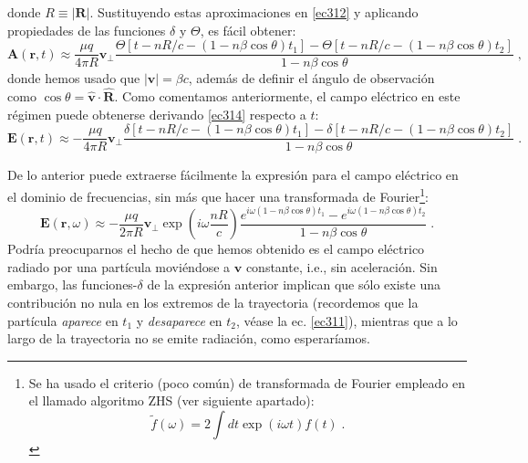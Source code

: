 \documentclass[11 pt, a4paper]{article} %
\numberwithin{equation}{section}
\numberwithin{figure}{section}
\numberwithin{table}{section}
\newcommand{\vect}[1]{\boldsymbol{\mathbf{#1}}}
\begin{document}
donde $R \equiv \left|\vect{R}\right|$. Sustituyendo estas aproximaciones en \eqref{ec312} y aplicando propiedades de las funciones $\delta$ y $\Theta$, es fácil obtener:
\begin{equation}
	\vect{A}\left(\vect{r}, t\right)\approx\frac{\mu q}{4\pi R}\vect{v}_\perp\frac{\Theta\left[t-nR/c-\left(1-n\beta\cos{\theta}\right)t_1\right]-\Theta\left[t-nR/c-\left(1-n\beta\cos{\theta}\right)t_2\right]}{1-n\beta\cos{\theta}}\;,\label{ec314}
\end{equation}
donde hemos usado que $\left|\vect{v}\right|=\beta c$, además de definir el ángulo de observación como $\cos{\theta}=\hat{\vect{v}}\cdot\hat{\vect{R}}$. Como comentamos anteriormente, el campo eléctrico en este régimen puede obtenerse derivando \eqref{ec314} respecto a $t$:
\begin{equation}
	\vect{E}\left(\vect{r}, t\right)\approx-\frac{\mu q}{4\pi R}\vect{v}_\perp\frac{\delta\left[t-nR/c-\left(1-n\beta\cos{\theta}\right)t_1\right]-\delta\left[t-nR/c-\left(1-n\beta\cos{\theta}\right)t_2\right]}{1-n\beta\cos{\theta}}\;.\label{ec315}
\end{equation}

De lo anterior puede extraerse fácilmente la expresión para el campo eléctrico en el dominio de frecuencias, sin más que hacer una transformada de Fourier\footnote{ Se ha usado el criterio (poco común) de transformada de Fourier empleado en el llamado algoritmo ZHS \cite{Zas1992} (ver siguiente apartado):
	$$\tilde{f}(\omega)=2\int dt \exp\left(i\omega t\right)f(t)\;.$$}:
\begin{equation}
	\vect{E}\left(\vect{r}, \omega\right)\approx-\frac{\mu q}{2\pi R}\vect{v}_\perp \exp\left(i\omega\frac{nR}{c}\right)\frac{e^{i\omega(1-n\beta\cos{\theta})t_1}-e^{i\omega(1-n\beta\cos{\theta})t_2}}{1-n\beta\cos{\theta}}\;.\label{ec316}
\end{equation}
Podría preocuparnos el hecho de que hemos obtenido es el campo eléctrico radiado por una partícula moviéndose a $\vect{v}$ constante, i.e., sin aceleración. Sin embargo, las funciones-$\delta$ de la expresión anterior implican que sólo existe una contribución no nula en los extremos de la trayectoria (recordemos que la partícula \textit{aparece} en $t_1$ y \textit{desaparece} en $t_2$, véase la ec. \ref{ec311}), mientras que a lo largo de la trayectoria no se emite radiación, como esperaríamos.
\end{document}
